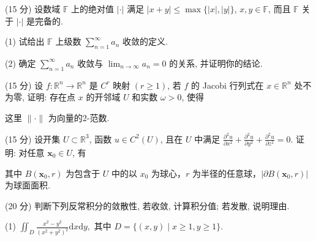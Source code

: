 (15 分) 设数域 $\mathbb{F}$ 上的绝对值 $|\cdot|$ 满足 $|x + y| \leq \max \{|x|, |y|\}$, $x, y \in \mathbb{F}$, 而且 $\mathbb{F}$ 关于 $|\cdot|$ 是完备的.\par
(1) 试给出 $\mathbb{F}$ 上级数 $\sum_{n=1}^{\infty} a_n$ 收敛的定义.\par
(2) 确定 $\sum_{n=1}^{\infty} a_n$ 收敛与 $\lim_{n \to \infty} a_n = 0$ 的关系, 并证明你的结论.\par
\par{}
(15 分) 设 $f: \mathbb{R}^n \to \mathbb{R}^n$ 是 $C^r$ 映射 $(r \geq 1)$, 若 $f$ 的 Jacobi 行列式在 $x \in \mathbb{R}^n$ 处不为零, 证明: 存在点 $x$ 的开邻域 $U$ 和实数 $\omega > 0$, 使得\par
\nopagebreak[4]
这里 $\| \cdot \|$ 为向量的2-范数.\par
\par{}
(15 分) 设开集 $U \subset \mathbb{R}^3$, 函数 $u \in C^2(U)$, 且在 $U$ 中满足 $\frac{\partial^2 u}{\partial x^2} + \frac{\partial^2 u}{\partial y^2} + \frac{\partial^2 u}{\partial z^2} = 0$. 证明: 对任意 $\pmb{x}_0 \in U$, 有\par
\nopagebreak[4]
其中 $B(\pmb{x}_0, r)$ 为包含于 $U$ 中的以 $x_0$ 为球心，$r$ 为半径的任意球，$|\partial B(\pmb{x}_0, r)|$ 为球面面积.\par
(20 分) 判断下列反常积分的敛散性, 若收敛, 计算积分值; 若发散, 说明理由.\par
(1) $\iint_{D} \frac{x^{2} - y^{2}}{(x^{2} + y^{2})^{2}} \mathrm{d}x \mathrm{d}y,$ 其中 $D = \{(x, y) \mid x \geq 1, y \geq 1\}$.\par
